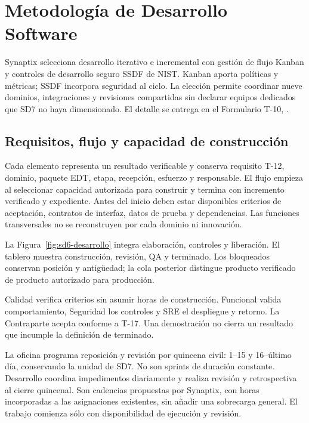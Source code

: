 \section{Metodología de Desarrollo Software}
Synaptix selecciona desarrollo iterativo e incremental con gestión de flujo Kanban y controles de desarrollo seguro SSDF de NIST. Kanban aporta políticas y métricas; SSDF incorpora seguridad al ciclo. La elección permite coordinar nueve dominios, integraciones y revisiones compartidas sin declarar equipos dedicados que SD7 no haya dimensionado. El detalle se entrega en el Formulario T-10, \ArchivoTDiez. \parencites[apartados Kanban Practices y Flow Metrics, pp.~3--5]{sd6-kanban}[sec.~2; tabla~1]{sd6-ssdf}

\subsection{Requisitos, flujo y capacidad de construcción}
Cada elemento representa un resultado verificable y conserva requisito T-12, dominio, paquete EDT, etapa, recepción, esfuerzo y responsable. El flujo empieza al seleccionar capacidad autorizada para construir y termina con incremento verificado y expediente. Antes del inicio deben estar disponibles criterios de aceptación, contratos de interfaz, datos de prueba y dependencias. Las funciones transversales no se reconstruyen por cada dominio ni innovación. \parencite[RT-04.04; RT-20.07, pp.~10/35]{sd6-bt}

La Figura~\ref{fig:sd6-desarrollo} integra elaboración, controles y liberación. El tablero muestra construcción, revisión, QA y terminado. Los bloqueados conservan posición y antigüedad; la cola posterior distingue producto verificado de producto autorizado para producción.

Calidad verifica criterios sin asumir horas de construcción. Funcional valida comportamiento, Seguridad los controles y SRE el despliegue y retorno. La Contraparte acepta conforme a T-17. Una demostración no cierra un resultado que incumple la definición de terminado.

La oficina programa reposición y revisión por quincena civil: 1--15 y 16--último día, conservando la unidad de SD7. No son sprints de duración constante. Desarrollo coordina impedimentos diariamente y realiza revisión y retrospectiva al cierre quincenal. Son cadencias propuestas por Synaptix, con horas incorporadas a las asignaciones existentes, sin añadir una sobrecarga general. El trabajo comienza sólo con disponibilidad de ejecución y revisión.

